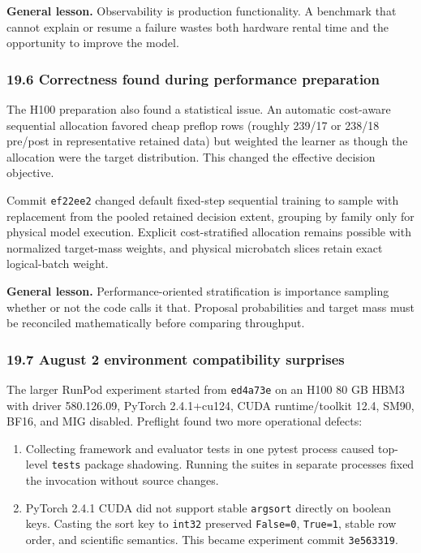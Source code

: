 \documentclass[
  10pt,
  letterpaper,
]{article}
\providecommand{\tightlist}{%
  \setlength{\itemsep}{0pt}\setlength{\parskip}{0pt}}
\begin{document}
\textbf{General lesson.} Observability is production functionality. A
benchmark that cannot explain or resume a failure wastes both hardware
rental time and the opportunity to improve the model.

\subsubsection{19.6 Correctness found during performance
preparation}\label{196-correctness-found-during-performance-preparation}

The H100 preparation also found a statistical issue. An automatic
cost-aware sequential allocation favored cheap preflop rows (roughly
239/17 or 238/18 pre/post in representative retained data) but weighted
the learner as though the allocation were the target distribution. This
changed the effective decision objective.

Commit \texttt{ef22ee2} changed default fixed-step sequential training
to sample with replacement from the pooled retained decision extent,
grouping by family only for physical model execution. Explicit
cost-stratified allocation remains possible with normalized target-mass
weights, and physical microbatch slices retain exact logical-batch
weight.

\textbf{General lesson.} Performance-oriented stratification is
importance sampling whether or not the code calls it that. Proposal
probabilities and target mass must be reconciled mathematically before
comparing throughput.

\subsubsection{19.7 August 2 environment compatibility
surprises}\label{197-august-2-environment-compatibility-surprises}

The larger RunPod experiment started from \texttt{ed4a73e} on an H100 80
GB HBM3 with driver 580.126.09, PyTorch 2.4.1+cu124, CUDA
runtime/toolkit 12.4, SM90, BF16, and MIG disabled. Preflight found two
more operational defects:

\begin{enumerate}
\def\labelenumi{\arabic{enumi}.}
\tightlist
\item
  Collecting framework and evaluator tests in one pytest process caused
  top-level \texttt{tests} package shadowing. Running the suites in
  separate processes fixed the invocation without source changes.
\item
  PyTorch 2.4.1 CUDA did not support stable \texttt{argsort} directly on
  boolean keys. Casting the sort key to \texttt{int32} preserved
  \texttt{False=0}, \texttt{True=1}, stable row order, and scientific
  semantics. This became experiment commit \texttt{3e563319}.
\end{enumerate}
\end{document}
